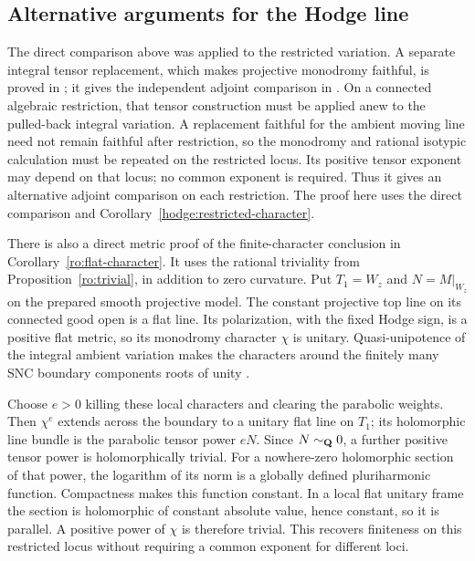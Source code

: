 \subsection{Alternative arguments for the Hodge line}
\label{ro:unitary-character}

\begin{remark}
The direct comparison above was applied to the restricted variation.
A separate integral tensor replacement, which makes
projective monodromy faithful, is proved in
\cite[\PfourTensor]{ProjectiveMethodsCompanion}; it gives the independent
adjoint comparison in \cite[\PfourAdjoint]{ProjectiveMethodsCompanion}.
On a connected algebraic restriction, that tensor construction must
be applied anew to the pulled-back integral variation. A replacement
faithful for the ambient moving line need not remain faithful after
restriction, so the monodromy and rational isotypic calculation must
be repeated on the restricted locus. Its positive tensor exponent may
depend on that locus; no common exponent is required. Thus it gives
an alternative adjoint comparison on each restriction. The proof here
uses the direct comparison and Corollary~\ref{hodge:restricted-character}.
\end{remark}

There is also a direct metric proof of the finite-character conclusion
in Corollary~\ref{ro:flat-character}. It uses the rational triviality
from Proposition~\ref{ro:trivial}, in addition to zero curvature.
Put $T_1=W_z$ and $N=M|_{W_z}$ on the prepared smooth
projective model. The constant projective top line on its connected
good open is a flat line. Its polarization, with the fixed Hodge sign,
is a positive flat metric, so its monodromy character $\chi$ is
unitary. Quasi-unipotence of the integral ambient variation makes
the characters around the finitely many SNC boundary components
roots of unity \cite{Schmid}.

Choose $e>0$ killing these local characters and clearing the
parabolic weights. Then $\chi^e$ extends across the boundary to
a unitary flat line on $T_1$; its holomorphic line bundle is the
parabolic tensor power $eN$. Since $N\sim_{\mathbf Q}0$, a further
positive tensor power is holomorphically trivial. For a nowhere-zero
holomorphic section of that power, the logarithm of its norm is
a globally defined pluriharmonic function. Compactness makes this
function constant. In a local flat unitary frame the section is
holomorphic of constant absolute value, hence constant, so it is
parallel. A positive power of $\chi$ is therefore trivial.
This recovers finiteness on this restricted locus without requiring
a common exponent for different loci.
